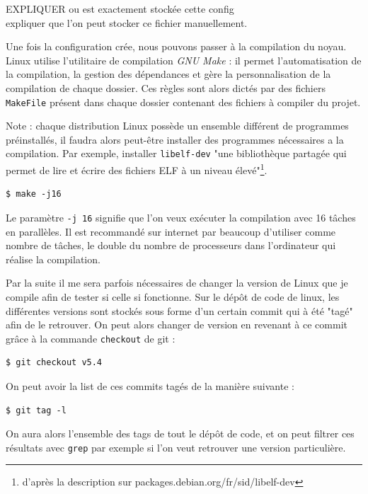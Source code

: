 \begin{center}
    \color{red}
    EXPLIQUER ou est exactement stockée cette config \\
expliquer que l'on peut stocker ce fichier manuellement.
\end{center}


Une fois la configuration crée, nous pouvons passer à la compilation du noyau. Linux utilise l'utilitaire de compilation \textit{GNU Make} : il permet l'automatisation de la compilation, la gestion des dépendances et gère la personnalisation de la compilation de chaque dossier. Ces règles sont alors dictés par des fichiers \texttt{MakeFile} présent dans chaque dossier contenant des fichiers à compiler du projet.

Note : chaque distribution Linux possède un ensemble différent de programmes préinstallés, il faudra alors peut-être installer des programmes nécessaires a la compilation. Par exemple, installer \texttt{libelf-dev} "une bibliothèque partagée qui permet de lire et écrire des fichiers ELF à un niveau élevé"\footnote{d'après la description sur packages.debian.org/fr/sid/libelf-dev}. 

\begin{lstlisting}[style=command, caption=Compilation sur plusieurs processeurs] 
$ make -j16
\end{lstlisting}

Le paramètre \texttt{-j 16} signifie que l'on veux exécuter la compilation avec 16 tâches en parallèles. Il est recommandé sur internet par beaucoup d'utiliser comme nombre de tâches, le double du nombre de processeurs dans l'ordinateur qui réalise la compilation.

Par la suite il me sera parfois nécessaires de changer la version de Linux que je compile afin de tester si celle si fonctionne. Sur le dépôt de code de linux, les différentes versions sont stockés sous forme d'un certain commit qui à été "tagé" afin de le retrouver. On peut alors changer de version en revenant à ce commit grâce à la commande \texttt{checkout} de \gls{git} : 
\begin{lstlisting}[style=command, caption=Retour sur un commit tagé]
$ git checkout v5.4
\end{lstlisting}
On peut avoir la list de ces commits tagés de la manière suivante : 
\begin{lstlisting}[style=command, caption=Comment lister les tags]
$ git tag -l
\end{lstlisting}
On aura alors l'ensemble des tags de tout le dépôt de code, et on peut filtrer ces résultats avec \texttt{grep} par exemple si l'on veut retrouver une version particulière.

